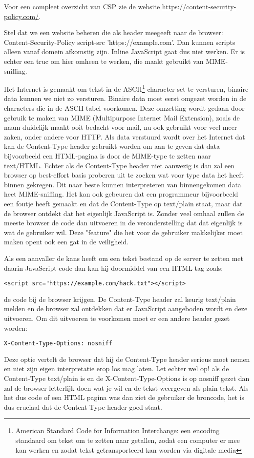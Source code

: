 Voor een compleet overzicht van CSP zie de website \url{https://content-security-policy.com/}.

Stel dat we een website beheren die als header meegeeft naar de browser: Content-Security-Policy script-src 'https://example.com'. Dan kunnen scripts alleen vanaf domein afkomstig zijn. Inline JavaScript gaat dus niet werken. Er is echter een truc om hier omheen te werken, die maakt gebruikt van MIME-sniffing.

Het Internet is gemaakt om tekst in de ASCII\footnote{American Standard Code for Information Interchange: een encoding standaard om tekst om te zetten naar getallen, zodat een computer er mee kan werken en zodat tekst getransporteerd kan worden via digitale media} character set te versturen, binaire data kunnen we niet zo versturen. Binaire data moet eerst omgezet worden in de characters die in de ASCII tabel voorkomen. Deze omzetting wordt gedaan door gebruik te maken van MIME (Multipurpose Internet Mail Extension), zoals de naam duidelijk maakt ooit bedacht voor mail, nu ook gebruikt voor veel meer zaken, onder andere voor HTTP. Als data verstuurd wordt over het Internet dat kan de Content-Type header gebruikt worden om aan te geven dat data bijvoorbeeld een HTML-pagina is door de MIME-type te zetten naar text/HTML. Echter als de Content-Type header niet aanwezig is dan zal een browser op best-effort basis proberen uit te zoeken wat voor type data het heeft binnen gekregen. Dit naar beste kunnen interpreteren van binnengekomen data heet MIME-sniffing. Het kan ook gebeuren dat een programmeur bijvoorbeeld een foutje heeft gemaakt en dat de Content-Type op text/plain staat, maar dat de browser ontdekt dat het eigenlijk JavaScript is. Zonder veel omhaal zullen de meeste browser de code dan uitvoeren in de veronderstelling dat dat eigenlijk is wat de gebruiker wil. Deze "feature" die het voor de gebruiker makkelijker moet maken opent ook een gat in de veiligheid.

Als een aanvaller de kans heeft om een tekst bestand op de server te zetten met daarin JavaScript code dan kan hij doormiddel van een HTML-tag zoals:
\begin{lstlisting}
<script src="https://example.com/hack.txt"></script>
\end{lstlisting}
de code bij de browser krijgen. De Content-Type header zal keurig text/plain melden en de browser zal ontdekken dat er JavaScript aangeboden wordt en deze uitvoeren. Om dit uitvoeren te voorkomen moet er een andere header gezet worden:
\begin{lstlisting}
X-Content-Type-Options: nosniff
\end{lstlisting}
Deze optie vertelt de browser dat hij de Content-Type header serieus moet nemen en niet zijn eigen interpretatie erop los mag laten. Let echter wel op! als de Content-Type text/plain is en de X-Content-Type-Options is op nosniff gezet dan zal de browser letterlijk doen wat je wil en de tekst weergeven als plain tekst. Als het dus code of een HTML pagina was dan ziet de gebruiker de broncode, het is dus cruciaal dat de Content-Type header goed staat.
